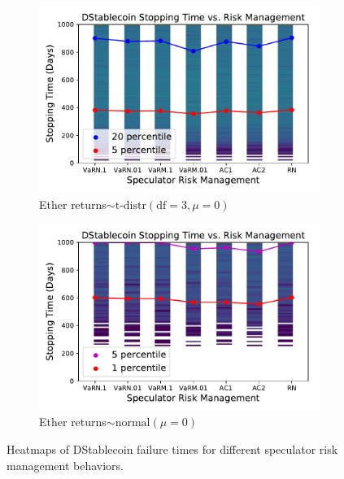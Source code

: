 \begin{figure}
	\centering
	\begin{subfigure}[b]{0.49\textwidth}
		\includegraphics[width=\textwidth]{figures/hist_stopping_risk_mgmt_tdist}
		\caption{Ether returns$\sim\text{t-distr}(\text{df}=3,\mu=0)$}\label{fig:hist_stopping_risk_mgmt_tdist}
	\end{subfigure}
	\begin{subfigure}[b]{0.49\textwidth}
		\includegraphics[width=\textwidth]{figures/hist_stopping_risk_mgmt_normal}
		\caption{Ether returns$\sim\text{normal}(\mu=0)$}\label{fig:hist_stopping_risk_mgmt_normal}
	\end{subfigure}
	\caption{Heatmaps of DStablecoin failure times for different speculator risk management behaviors.}\label{fig:stopping_risk_mgmt}
\end{figure}



